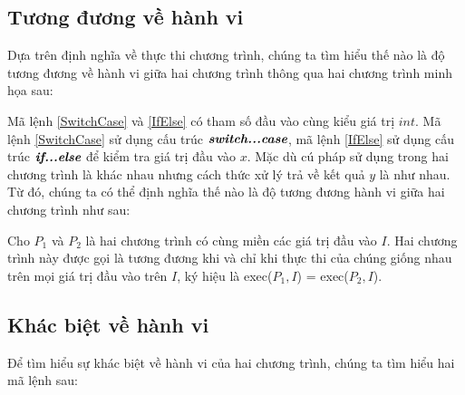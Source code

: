 \subsection{Tương đương về hành vi}

Dựa trên định nghĩa về thực thi chương trình, chúng ta tìm hiểu thế nào là độ tương đương về hành vi giữa hai chương trình thông qua hai chương trình minh họa sau:

\begin{minipage}[t]{0.45\linewidth}
	
\end{minipage}%
\hfill\vrule\hfill
\begin{minipage}[t]{0.45\linewidth}
	
\end{minipage}%

Mã lệnh \ref{SwitchCase} và \ref{IfElse} có tham số đầu vào cùng kiểu giá trị $int$. Mã lệnh \ref{SwitchCase} sử dụng cấu trúc $\textit{\textbf{switch...case}}$, mã lệnh \ref{IfElse} sử dụng cấu trúc $\textit{\textbf{if...else}}$ để kiểm tra giá trị đầu vào $x$. Mặc dù cú pháp sử dụng trong hai chương trình là khác nhau nhưng cách thức xử lý trả về kết quả $y$ là như nhau. Từ đó, chúng ta có thể định nghĩa thế nào là độ tương đương hành vi giữa hai chương trình như sau:

\begin{definition}
 Cho $P_{1}$ và $P_{2}$ là hai chương trình có cùng miền các giá trị đầu vào $I$. Hai chương trình này được gọi là tương đương khi và chỉ khi thực thi của chúng giống nhau trên mọi giá trị đầu vào trên $I$, ký hiệu là exec($P_{1}, I$) = exec($P_{2}, I$). 
\end{definition}	
	
\subsection{Khác biệt về hành vi}
Để tìm hiểu sự khác biệt về hành vi của hai chương trình, chúng ta tìm hiểu hai mã lệnh sau:

\begin{minipage}[t]{0.45\linewidth}
	
\end{minipage}%
\hfill\vrule\hfill
\begin{minipage}[t]{0.45\linewidth}
	
\end{minipage}%


